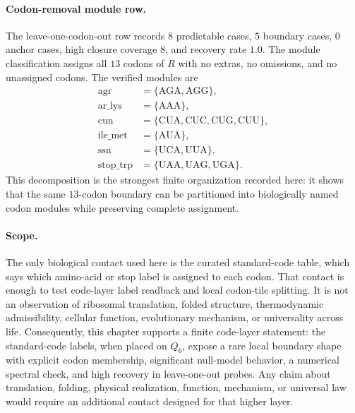\paragraph{Codon-removal module row.}
The leave-one-codon-out row records $8$ predictable cases, $5$ boundary cases, $0$ anchor cases, high closure coverage $8$, and recovery rate $1.0$.  The module classification assigns all $13$ codons of $R$ with no extras, no omissions, and no unassigned codons.  The verified modules are
$$
\begin{aligned}
\mathrm{agr}&=\{\mathrm{AGA},\mathrm{AGG}\},\\
\mathrm{ar\_lys}&=\{\mathrm{AAA}\},\\
\mathrm{cun}&=\{\mathrm{CUA},\mathrm{CUC},\mathrm{CUG},\mathrm{CUU}\},\\
\mathrm{ile\_met}&=\{\mathrm{AUA}\},\\
\mathrm{ssn}&=\{\mathrm{UCA},\mathrm{UUA}\},\\
\mathrm{stop\_trp}&=\{\mathrm{UAA},\mathrm{UAG},\mathrm{UGA}\}.
\end{aligned}
$$
This decomposition is the strongest finite organization recorded here: it shows that the same $13$-codon boundary can be partitioned into biologically named codon modules while preserving complete assignment.

\paragraph{Scope.}
The only biological contact used here is the curated standard-code table, which says which amino-acid or stop label is assigned to each codon.  That contact is enough to test code-layer label readback and local codon-tile splitting.  It is not an observation of ribosomal translation, folded structure, thermodynamic admissibility, cellular function, evolutionary mechanism, or universality across life.  Consequently, this chapter supports a finite code-layer statement: the standard-code labels, when placed on $Q_6$, expose a rare local boundary shape with explicit codon membership, significant null-model behavior, a numerical spectral check, and high recovery in leave-one-out probes.  Any claim about translation, folding, physical realization, function, mechanism, or universal law would require an additional contact designed for that higher layer.